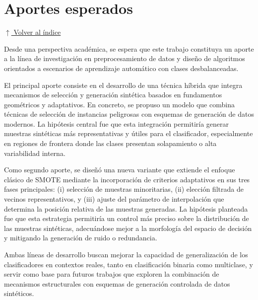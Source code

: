 \documentclass[12pt,a4paper]{article}
\begin{document}









\section{Aportes esperados} 
\noindent\hyperlink{toc}{\small$\uparrow$ Volver al índice}

Desde una perspectiva académica, se espera que este trabajo constituya un aporte a la línea de investigación en preprocesamiento de datos y diseño de algoritmos orientados a escenarios de aprendizaje automático con clases desbalanceadas.

El principal aporte consiste en el desarrollo de una técnica híbrida que integra mecanismos de selección y generación sintética basados en fundamentos geométricos y adaptativos. En concreto, se propuso un modelo que combina técnicas de selección de instancias peligrosas con esquemas de generación de datos modernos. La hipótesis central fue que esta integración permitiría generar muestras sintéticas más representativas y útiles para el clasificador, especialmente en regiones de frontera donde las clases presentan solapamiento o alta variabilidad interna.

Como segundo aporte, se diseñó una nueva variante que extiende el enfoque clásico de SMOTE mediante la incorporación de criterios adaptativos en sus tres fases principales: (i) selección de muestras minoritarias, (ii) elección filtrada de vecinos representativos, y (iii) ajuste del parámetro de interpolación que determina la posición relativa de las muestras generadas. La hipótesis planteada fue que esta estrategia permitiría un control más preciso sobre la distribución de las muestras sintéticas, adecuándose mejor a la morfología del espacio de decisión y mitigando la generación de ruido o redundancia.

Ambas líneas de desarrollo buscan mejorar la capacidad de generalización de los clasificadores en contextos reales, tanto en clasificación binaria como multiclase, y servir como base para futuros trabajos que exploren la combinación de mecanismos estructurales con esquemas de generación controlada de datos sintéticos.
\end{document}
